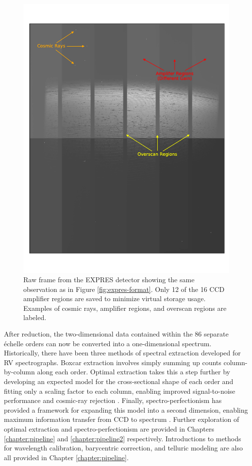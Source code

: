 \begin{figure}
    \centering
    \includegraphics[width=\textwidth]{figures-1/expres-raw.pdf}
    \caption{Raw frame from the EXPRES detector showing the same observation as in Figure \ref{fig:expres-format}. Only 12 of the 16 CCD amplifier regions are saved to minimize virtual storage usage. Examples of cosmic rays, amplifier regions, and overscan regions are labeled.}
    \label{fig:expres-raw}
\end{figure}

After reduction, the two-dimensional data contained within the 86 separate \'echelle orders can now be converted into a one-dimensional spectrum. Historically, there have been three methods of spectral extraction developed for RV spectrographs. Boxcar extraction involves simply summing up counts column-by-column along each order. Optimal extraction takes this a step further by developing an expected model for the cross-sectional shape of each order and fitting only a scaling factor to each column, enabling improved signal-to-noise performance and cosmic-ray rejection \citep{horne_optimal_1986}. Finally, spectro-perfectionism has provided a framework for expanding this model into a second dimension, enabling maximum information transfer from CCD to spectrum \citep{bolton_spectro-perfectionism_2009}. Further exploration of optimal extraction and spectro-perfectionism are provided in Chapters \ref{chapter:pipeline} and \ref{chapter:pipeline2} respectively. Introductions to methods for wavelength calibration, barycentric correction, and telluric modeling are also all provided in Chapter \ref{chapter:pipeline}.


